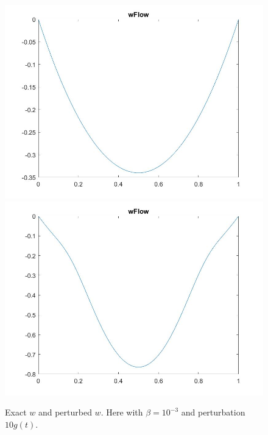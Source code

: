 \documentclass[11pt, a4paper]{article}
\theoremstyle{definition}
\begin{document}
\begin{figure}[h]
	\includegraphics[scale=0.3]{KalDneww3.jpg}
	\includegraphics[scale=0.3]{KalDneww4.jpg}
	\caption{Exact $w$ and perturbed $w$. Here with $\beta =10^{-3}$ and perturbation $10g(t)$.}
	\label{Figlint4c}
\end{figure}
\end{document}
